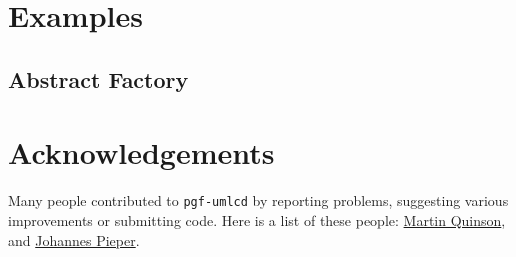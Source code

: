 \documentclass{article}
\newcommand{\example}[1]{
\resizebox{\linewidth}{!}{

}

}
\begin{document}
\section{Examples}
\subsection{Abstract Factory}
\example{abstract-factory}

\section{Acknowledgements}
Many people contributed to \texttt{pgf-umlcd} by reporting problems,
suggesting various improvements or submitting code. Here is a list of
these people: \href{mailto:martin.quinson@loria.fr}{Martin Quinson},
and \href{mailto:johannes_pieper@yahoo.de}{Johannes Pieper}.
\end{document}
